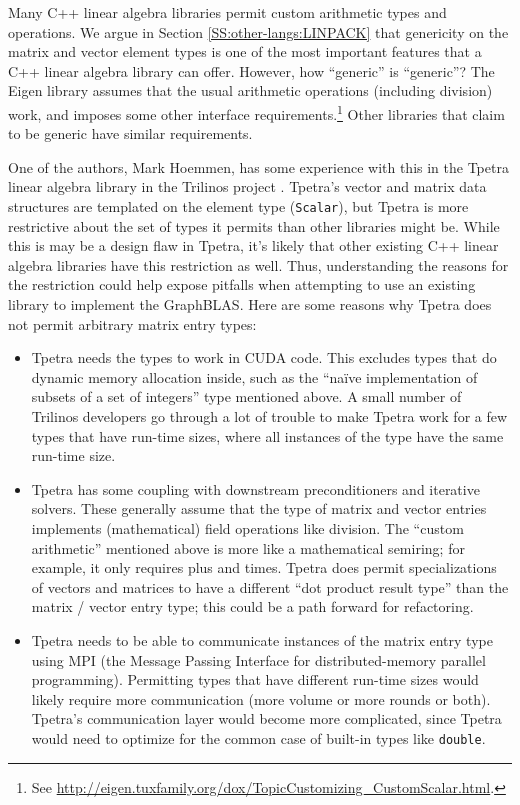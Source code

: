 Many C++ linear algebra libraries permit custom arithmetic types and
operations.  We argue in Section \ref{SS:other-langs:LINPACK} that
genericity on the matrix and vector element types is one of the most
important features that a C++ linear algebra library can offer.
However, how ``generic'' is ``generic''?  The Eigen library assumes
that the usual arithmetic operations (including division) work, and
imposes some other interface requirements.\footnote{See
  \url{http://eigen.tuxfamily.org/dox/TopicCustomizing_CustomScalar.html}.}
Other libraries that claim to be generic have similar requirements.

One of the authors, Mark Hoemmen, has some experience with this in the
Tpetra linear algebra library \cite{baker2012tpetra} in the Trilinos
project \cite{heroux2005trilinos}.  Tpetra's vector and matrix data
structures are templated on the element type (\texttt{Scalar}), but
Tpetra is more restrictive about the set of types it permits than
other libraries might be.  While this is may be a design flaw in
Tpetra, it's likely that other existing C++ linear algebra libraries
have this restriction as well.  Thus, understanding the reasons for
the restriction could help expose pitfalls when attempting to use an
existing library to implement the GraphBLAS.  Here are some reasons
why Tpetra does not permit arbitrary matrix entry types:
\begin{itemize}
\item Tpetra needs the types to work in CUDA code.  This excludes
  types that do dynamic memory allocation inside, such as the ``na\"ive
  implementation of subsets of a set of integers'' type mentioned
  above.  A small number of Trilinos developers go through a lot of
  trouble to make Tpetra work for a few types that have run-time
  sizes, where all instances of the type have the same run-time size.
\item Tpetra has some coupling with downstream preconditioners and
  iterative solvers.  These generally assume that the type of matrix
  and vector entries implements (mathematical) field operations like
  division.  The ``custom arithmetic'' mentioned above is more like a
  mathematical semiring; for example, it only requires plus and times.
  Tpetra does permit specializations of vectors and matrices to have a
  different ``dot product result type'' than the matrix / vector entry
  type; this could be a path forward for refactoring.
\item Tpetra needs to be able to communicate instances of the matrix
  entry type using MPI (the Message Passing Interface for
  distributed-memory parallel programming).  Permitting types that
  have different run-time sizes would likely require more
  communication (more volume or more rounds or both).  Tpetra's
  communication layer would become more complicated, since Tpetra
  would need to optimize for the common case of built-in types like
  \texttt{double}.
\end{itemize}

